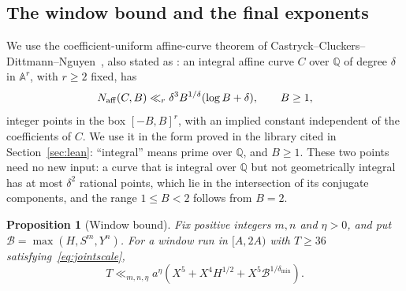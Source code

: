 \documentclass[11pt]{article}
\newtheorem{proposition}[theorem]{Proposition}
\theoremstyle{definition}
\theoremstyle{remark}
\begin{document}
\subsection{The window bound and the final exponents}\label{sec:jointcount}

We use the coefficient-uniform affine-curve theorem of
Castryck--Cluckers--Dittmann--Nguyen~\cite[Theorem~3]{CCDN}, also stated as
\cite[Corollary~2.2]{CDHNV}: an integral affine curve $C$ over $\mathbb Q$ of degree $\delta$
in $\mathbb A^r$, with $r\ge2$ fixed, has
\begin{equation}\label{eq:jointexternal}
 N_{\rm aff}(C,B)\ll_r \delta^3 B^{1/\delta}(\log B+\delta),\qquad B\ge1,
\end{equation}
integer points in the box $[-B,B]^r$, with an implied constant
independent of the coefficients of $C$. We use it in the form proved in the
library cited in Section~\ref{sec:lean}: ``integral'' means prime over
$\mathbb Q$, and $B\ge1$. These two points need no new input: a curve that is
integral over $\mathbb Q$ but not geometrically integral has at most $\delta^2$
rational points, which lie in the intersection of its conjugate components, and
the range $1\le B<2$ follows from $B=2$.

\begin{proposition}[Window bound]\label{prop:jointwindow}
Fix positive integers $m,n$ and $\eta>0$, and put $\mathcal B=\max(H,S^m,Y^n)$.
For a window run in $[A,2A)$ with $T\ge36$ satisfying~\eqref{eq:jointscale},
\begin{equation}\label{eq:jointcount}
 T\ll_{m,n,\eta}a^\eta\left(
 X^5+X^4H^{1/2}+X^5\mathcal B^{1/\delta_{\min}}\right).
\end{equation}
\end{proposition}
\end{document}
